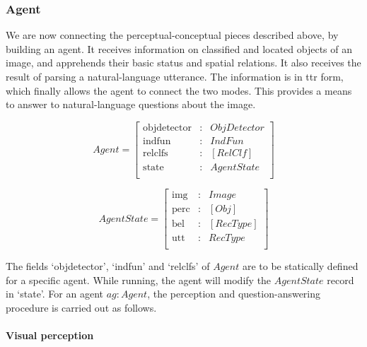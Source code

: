 \subsubsection{Agent}
\label{sec:agent}

We are now connecting the perceptual-conceptual pieces described above, by building an agent.
It receives information on classified and located objects of an image, and apprehends their basic status and spatial relations.
It also receives the result of parsing a natural-language utterance.
The information is in \gls{ttr} form, which finally allows the agent to connect the two modes.
This provides a means to answer to natural-language questions about the image.

\begin{equation}\label{eq:agent}
Agent = \left[\begin{array}{rcl}
    \text{objdetector} &:& ObjDetector \\
    \text{indfun} &:& IndFun \\
    \text{relclfs} &:& [RelClf] \\
    \text{state} &:& AgentState \\
    \end{array}\right]
\end{equation}

\begin{equation}\label{eq:state}
AgentState = \left[\begin{array}{rcl}
    \text{img} &:& Image \\
    \text{perc} &:& [Obj] \\
    \text{bel} &:& [RecType] \\
    \text{utt} &:& RecType \\
    \end{array}\right]
\end{equation}

The fields `objdetector', `indfun' and `relclfs' of $Agent$ are to be statically defined for a specific agent.
While running, the agent will modify the $AgentState$ record in `state'.
For an agent $ag : Agent$, the perception and question-answering procedure is carried out as follows.

\paragraph{Visual perception}

